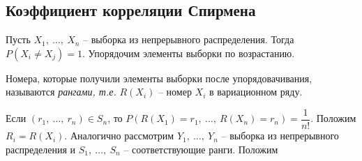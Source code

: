 \subsection{Коэффициент корреляции Спирмена}

Пусть $\displaystyle X_{1} ,\ \dotsc ,\ X_{n}$ -- выборка из непрерывного распределения. Тогда $\displaystyle P( X_{i} \neq X_{j}) =1$. Упорядочим элементы выборки по возрастанию.
\begin{definition}
    Номера, которые получили элементы выборки после упорядовачивания, называются \textit{рангами}\textit{, т.е. }$\displaystyle R( X_{i})$ -- номер $\displaystyle X_{i}$ в вариационном ряду.
\end{definition}
Если $\displaystyle \left( r_{1} ,\ \dotsc ,\ r_{n}\right) \in S_{n}$, то $\displaystyle P( R( X_{1}) =r_{1} ,\ \dotsc ,\ R( X_{n}) =r_{n}) =\dfrac{1}{n!}$. Положим $\displaystyle R_{i} =R\left( X_{i}\right)$. Аналогично рассмотрим $\displaystyle Y_{1} ,\ \dotsc ,\ Y_{n}$ -- выборка из непрерывного распределения и $\displaystyle S_{1} ,\ \dotsc ,\ S_{n}$ -- соответствующие ранги. Положим


